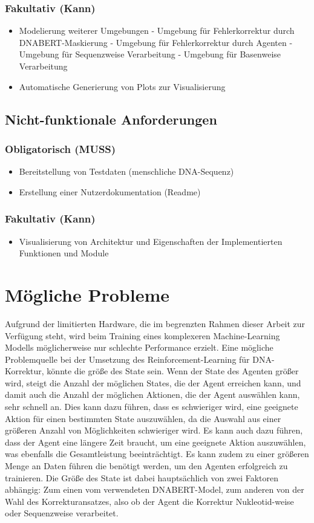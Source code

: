 \documentclass[oneside,bibliography=totocnumbered,BCOR=5mm]{scrbook}%
\theoremstyle{definition}
\theoremstyle{definition}
\theoremstyle{definition}
\theoremstyle{definition}
\theoremstyle{definition}
\theoremstyle{definition}
\begin{document}
\subsubsection{Fakultativ (Kann)}
\begin{itemize}
  \item Modelierung weiterer Umgebungen
    \subitem - Umgebung für Fehlerkorrektur durch DNABERT-Maskierung
    \subitem - Umgebung für Fehlerkorrektur durch Agenten
    \subitem - Umgebung für Sequenzweise Verarbeitung
    \subitem - Umgebung für Basenweise Verarbeitung
  \item Automatische Generierung von Plots zur Visualisierung
  \end{itemize}
\subsection{Nicht-funktionale Anforderungen}
\subsubsection{Obligatorisch (MUSS)}
\begin{itemize}
  \item Bereitstellung von Testdaten (menschliche DNA-Sequenz)
  \item Erstellung einer Nutzerdokumentation (Readme)
  \end{itemize}
\subsubsection{Fakultativ (Kann)}
\begin{itemize}
  \item Visualisierung von Architektur und Eigenschaften der Implementierten Funktionen und Module
  \end{itemize}

\section{Mögliche Probleme}
Aufgrund der limitierten Hardware, die im begrenzten Rahmen dieser Arbeit zur Verfügung steht,
wird beim Training eines komplexeren Machine-Learning Modells möglicherweise nur schlechte Performance erzielt.
Eine mögliche Problemquelle bei der Umsetzung des Reinforcement-Learning für DNA-Korrektur, 
könnte die größe des State sein. 
Wenn der State des Agenten größer wird, steigt die Anzahl der möglichen States, 
die der Agent erreichen kann, und damit auch die Anzahl der möglichen Aktionen, 
die der Agent auswählen kann, sehr schnell an. 
Dies kann dazu führen, dass es schwieriger wird, eine geeignete Aktion für einen bestimmten State auszuwählen, 
da die Auswahl aus einer größeren Anzahl von Möglichkeiten schwieriger wird. 
Es kann auch dazu führen, dass der Agent eine längere Zeit braucht, um eine geeignete Aktion auszuwählen, 
was ebenfalls die Gesamtleistung beeinträchtigt.
Es kann zudem zu einer größeren Menge an Daten führen die benötigt werden, um den Agenten erfolgreich zu trainieren.
Die Größe des State ist dabei hauptsächlich von zwei Faktoren abhängig:
Zum einen vom verwendeten DNABERT-Model, zum anderen von der Wahl des Korrekturansatzes, also
ob der Agent die Korrektur Nukleotid-weise oder Sequenzweise verarbeitet.
\end{document}
